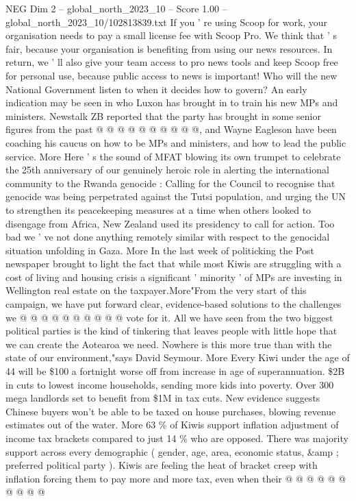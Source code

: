 \begin{textsample}{NEG Dim 2 – global\_north\_2023\_10 – Score 1.00 – global\_north\_2023\_10/102813839.txt}
If you ' re using Scoop for work, your organisation needs to pay a small license fee with Scoop Pro.
We think that ' s fair, because your organisation is benefiting from using our news resources.
In return, we ' ll also give your team access to pro news tools and keep Scoop free for personal use, because public access to news is important!
Who will the new National Government listen to when it decides how to govern?
An early indication may be seen in who Luxon has brought in to train his new MPs and ministers.
Newstalk ZB reported that the party has brought in some senior figures from the past @ @ @ @ @ @ @ @ @ @, and Wayne Eagleson have been coaching his caucus on how to be MPs and ministers, and how to lead the public service.
More Here ' s the sound of MFAT blowing its own trumpet to celebrate the 25th anniversary of our genuinely heroic role in alerting the international community to the Rwanda genocide : Calling for the Council to recognise that genocide was being perpetrated against the Tutsi population, and urging the UN to strengthen its peacekeeping measures at a time when others looked to disengage from Africa, New Zealand used its presidency to call for action.
Too bad we ' ve not done anything remotely similar with respect to the genocidal situation unfolding in Gaza.
More In the last week of politicking the Post newspaper brought to light the fact that while most Kiwis are struggling with a cost of living and housing crisis a significant ' minority ' of MPs are investing in Wellington real estate on the taxpayer.More"From the very start of this campaign, we have put forward clear, evidence-based solutions to the challenges we @ @ @ @ @ @ @ @ @ @ vote for it.
All we have seen from the two biggest political parties is the kind of tinkering that leaves people with little hope that we can create the Aotearoa we need.
Nowhere is this more true than with the state of our environment,"says David Seymour.
More Every Kiwi under the age of 44 will be \$100 a fortnight worse off from increase in age of superannuation. \$2B in cuts to lowest income households, sending more kids into poverty.
Over 300 mega landlords set to benefit from \$1M in tax cuts.
New evidence suggests Chinese buyers won't be able to be taxed on house purchases, blowing revenue estimates out of the water.
More 63 \% of Kiwis support inflation adjustment of income tax brackets compared to just 14 \% who are opposed.
There was majority support across every demographic ( gender, age, area, economic status, \&amp ; preferred political party ).
Kiwis are feeling the heat of bracket creep with inflation forcing them to pay more and more tax, even when their @ @ @ @ @ @ @ @ @ @

\end{textsample}
